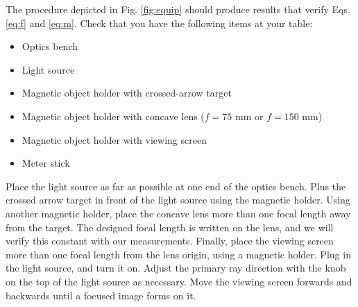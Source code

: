 \documentclass[12pt,twocolumn]{article}
\begin{document}
\noindent
The procedure depicted in Fig. \ref{fig:equip} should produce results that verify Eqs. \ref{eq:f} and \ref{eq:m}.  Check that you have the following items at your table:

\begin{itemize}
\item Optics bench
\item Light source
\item Magnetic object holder with crossed-arrow target
\item Magnetic object holder with concave lens ($f = 75$ mm or $f=150$ mm)
\item Magnetic object holder with viewing screen
\item Meter stick
\end{itemize}

Place the light source as far as possible at one end of the optics bench.  Plus the crossed arrow target in front of the light source using the magnetic holder.  Using another magnetic holder, place the concave lens more than one focal length away from the target.  The designed focal length is written on the lens, and we will verify this constant with our measurements.  Finally, place the viewing screen more than one focal length from the lens origin, using a magnetic holder.  Plug in the light source, and turn it on.  Adjust the primary ray direction with the knob on the top of the light source as necessary.  Move the viewing screen forwards and backwards until a focused image forms on it.
\end{document}
